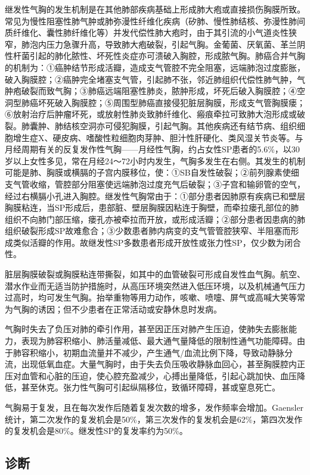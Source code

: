 继发性气胸的发生机制是在其他肺部疾病基础上形成肺大疱或直接损伤胸膜所致。常见为慢性阻塞性肺气肿或肺弥漫性纤维化疾病（矽肺、慢性肺结核、弥漫性肺间质纤维化、囊性肺纤维化等）并发代偿性肺大疱时，由于其引流的小气道炎性狭窄，肺泡内压力急骤升高，导致肺大疱破裂，引起气胸。金葡菌、厌氧菌、革兰阴性杆菌引起的肺化脓性、坏死性炎症亦可溃破入胸腔，形成脓气胸。肺癌合并气胸的机制为：①癌肿结节形成活瓣，造成支气管腔不完全阻塞，远端肺泡过度膨胀，破入胸膜腔；②癌肿完全堵塞支气管，引起肺不张，邻近肺组织代偿性肺气肿，气肿疱破裂而致气胸；③肺癌远端阻塞性肺炎，脓肿形成，坏死后破入胸膜腔；④空洞型肺癌坏死破入胸膜腔；⑤周围型肺癌直接侵犯脏层胸膜，形成支气管胸膜瘘；⑥放射治疗后肿瘤坏死，或放射性肺炎致肺纤维化、瘢痕牵拉可致肺大泡形成或破裂。肺囊肿、肺结核空洞亦可侵犯胸膜，引起气胸。其他疾病还有结节病、组织细胞增生症X、硬皮病、嗜酸性粒细胞肉芽肿、胆汁性肝硬化、类风湿关节炎等。与月经周期有关的反复发作性气胸------月经性气胸，约占女性SP患者的5.6\%，以30岁以上女性多见，常在月经24～72小时内发生，气胸多发生在右侧。其发生的机制可能是肺、胸膜或横膈的子宫内膜移位，使：①SB自发性破裂；②前列腺素使细支气管收缩，管腔部分阻塞使远端肺泡过度充气后破裂；③子宫和输卵管的空气，经过右横膈小孔进入胸腔。继发性气胸常由于：①部分患者因肺原有疾病已和壁层胸膜粘连，当SP形成后，患部脏、壁层胸膜因粘连于胸壁，而牵拉瘘孔部位的肺组织不向肺门部压缩，瘘孔亦被牵拉而开放，或形成活瓣；②部分患者因患病的肺组织破裂形成SP故难愈合；③少数患者肺内病变的支气管管腔狭窄、半阻塞而形成类似活瓣的作用。故继发性SP多数患者形成开放性或张力性SP，仅少数为闭合性。

脏层胸膜破裂或胸膜粘连带撕裂，如其中的血管破裂可形成自发性血气胸。航空、潜水作业而无适当防护措施时，从高压环境突然进入低压环境，以及机械通气压力过高时，均可发生气胸。抬举重物等用力动作，咳嗽、喷嚏、屏气或高喊大笑等常为气胸的诱因；但不少患者在正常活动或安静休息时发病。

气胸时失去了负压对肺的牵引作用，甚至因正压对肺产生压迫，使肺失去膨胀能力，表现为肺容积缩小、肺活量减低、最大通气量降低的限制性通气功能障碍。由于肺容积缩小，初期血流量并不减少，产生通气/血流比例下降，导致动静脉分流，出现低氧血症。大量气胸时，由于失去负压吸收静脉血回心，甚至胸膜腔内正压对血管和心脏的压迫，使心腔充盈减少，心搏出量降低，引起心跳加快、血压降低，甚至休克。张力性气胸可引起纵隔移位，致循环障碍，甚或窒息死亡。

气胸易于复发，且在每次发作后随着复发次数的增多，发作频率会增加。Gaensler统计，第二次发作的复发机会是50\%，第三次发作的复发机会是62\%，第四次发作的复发机会是80\%。继发性SP的复发率约为50\%。

\subsection{诊断}

